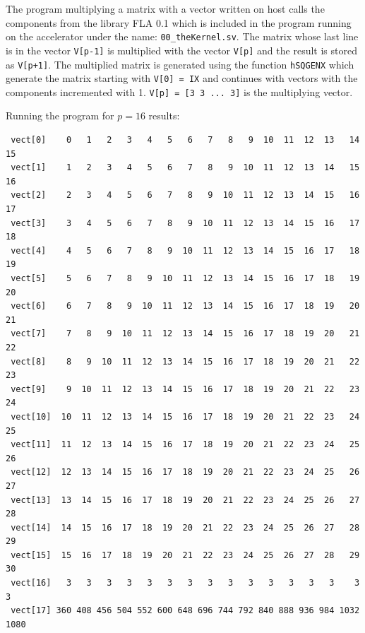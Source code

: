 \begin{exemplu}
The program multiplying a matrix with a vector written on host calls the components from the library FLA 0.1 which is included in the program running on the accelerator under the name: {\tt 00\_theKernel.sv}. The matrix whose last line is in the vector {\tt V[p-1]} is multiplied with the vector {\tt V[p]} and the result is stored as {\tt V[p+1]}. The multiplied matrix is generated using the function {\tt hSQGENX} which generate the  matrix starting with {\tt V[0] = IX} and continues with vectors with the components incremented with 1. {\tt V[p] = [3 3  ... 3]} is the multiplying vector.  

{\em 
{}
}

{\em 
{}
}
Running the program for $p = 16$ results:
\begin{verbatim}
 vect[0]    0   1   2   3   4   5   6   7   8   9  10  11  12  13   14   15
 vect[1]    1   2   3   4   5   6   7   8   9  10  11  12  13  14   15   16
 vect[2]    2   3   4   5   6   7   8   9  10  11  12  13  14  15   16   17
 vect[3]    3   4   5   6   7   8   9  10  11  12  13  14  15  16   17   18
 vect[4]    4   5   6   7   8   9  10  11  12  13  14  15  16  17   18   19
 vect[5]    5   6   7   8   9  10  11  12  13  14  15  16  17  18   19   20
 vect[6]    6   7   8   9  10  11  12  13  14  15  16  17  18  19   20   21
 vect[7]    7   8   9  10  11  12  13  14  15  16  17  18  19  20   21   22
 vect[8]    8   9  10  11  12  13  14  15  16  17  18  19  20  21   22   23
 vect[9]    9  10  11  12  13  14  15  16  17  18  19  20  21  22   23   24
 vect[10]  10  11  12  13  14  15  16  17  18  19  20  21  22  23   24   25
 vect[11]  11  12  13  14  15  16  17  18  19  20  21  22  23  24   25   26
 vect[12]  12  13  14  15  16  17  18  19  20  21  22  23  24  25   26   27
 vect[13]  13  14  15  16  17  18  19  20  21  22  23  24  25  26   27   28
 vect[14]  14  15  16  17  18  19  20  21  22  23  24  25  26  27   28   29
 vect[15]  15  16  17  18  19  20  21  22  23  24  25  26  27  28   29   30
 vect[16]   3   3   3   3   3   3   3   3   3   3   3   3   3   3    3    3
 vect[17] 360 408 456 504 552 600 648 696 744 792 840 888 936 984 1032 1080
\end{verbatim}


\end{exemplu}

